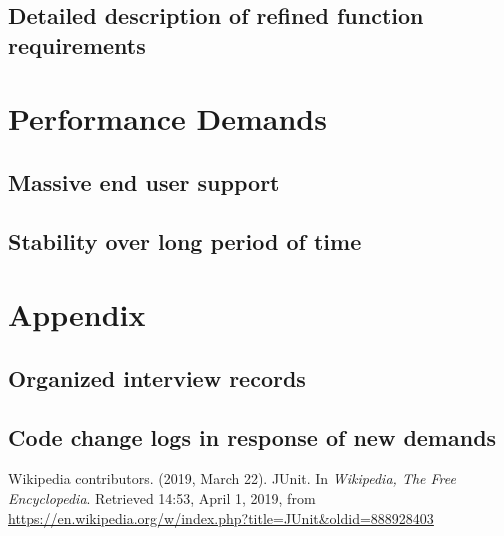 \documentclass[a4paper]{report}
\begin{document}
\section{Detailed description of refined function requirements}

\chapter{Performance Demands}

\section{Massive end user support}

\section{Stability over long period of time}

\chapter{Appendix}

\section{Organized interview records}

\section{Code change logs in response of new demands}


\begin{thebibliography}{A}


Wikipedia contributors. (2019, March 22). JUnit. In \emph{Wikipedia, The Free Encyclopedia}. Retrieved 14:53, April 1, 2019, from \url{https://en.wikipedia.org/w/index.php?title=JUnit&oldid=888928403}
\end{thebibliography}
\end{document}
